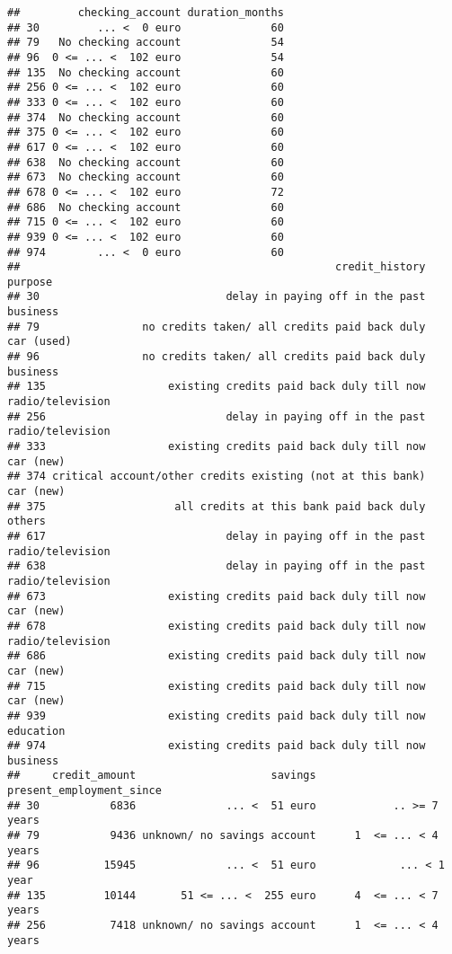 \documentclass[
]{article}
\begin{document}
\begin{verbatim}
##         checking_account duration_months
## 30         ... <  0 euro              60
## 79   No checking account              54
## 96  0 <= ... <  102 euro              54
## 135  No checking account              60
## 256 0 <= ... <  102 euro              60
## 333 0 <= ... <  102 euro              60
## 374  No checking account              60
## 375 0 <= ... <  102 euro              60
## 617 0 <= ... <  102 euro              60
## 638  No checking account              60
## 673  No checking account              60
## 678 0 <= ... <  102 euro              72
## 686  No checking account              60
## 715 0 <= ... <  102 euro              60
## 939 0 <= ... <  102 euro              60
## 974        ... <  0 euro              60
##                                                 credit_history          purpose
## 30                             delay in paying off in the past         business
## 79                no credits taken/ all credits paid back duly       car (used)
## 96                no credits taken/ all credits paid back duly         business
## 135                   existing credits paid back duly till now radio/television
## 256                            delay in paying off in the past radio/television
## 333                   existing credits paid back duly till now        car (new)
## 374 critical account/other credits existing (not at this bank)        car (new)
## 375                    all credits at this bank paid back duly           others
## 617                            delay in paying off in the past radio/television
## 638                            delay in paying off in the past radio/television
## 673                   existing credits paid back duly till now        car (new)
## 678                   existing credits paid back duly till now radio/television
## 686                   existing credits paid back duly till now        car (new)
## 715                   existing credits paid back duly till now        car (new)
## 939                   existing credits paid back duly till now        education
## 974                   existing credits paid back duly till now         business
##     credit_amount                     savings present_employment_since
## 30           6836              ... <  51 euro            .. >= 7 years
## 79           9436 unknown/ no savings account      1  <= ... < 4 years
## 96          15945              ... <  51 euro             ... < 1 year
## 135         10144       51 <= ... <  255 euro      4  <= ... < 7 years
## 256          7418 unknown/ no savings account      1  <= ... < 4 years

\end{verbatim}
\end{document}
